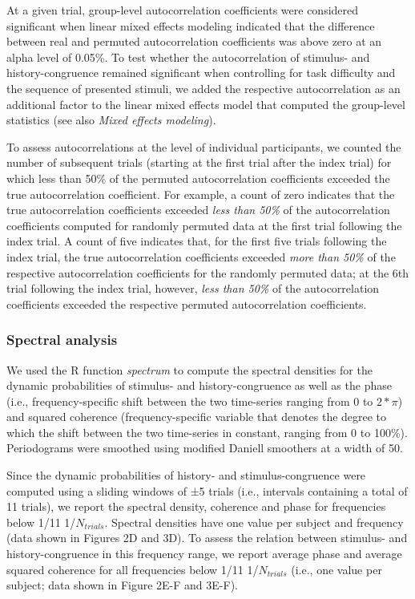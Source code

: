 \documentclass[
]{article}
\begin{document}
At a given trial, group-level autocorrelation coefficients were
considered significant when linear mixed effects modeling indicated that
the difference between real and permuted autocorrelation coefficients
was above zero at an alpha level of 0.05\%. To test whether the
autocorrelation of stimulus- and history-congruence remained significant
when controlling for task difficulty and the sequence of presented
stimuli, we added the respective autocorrelation as an additional factor
to the linear mixed effects model that computed the group-level
statistics (see also \emph{Mixed effects modeling}).

To assess autocorrelations at the level of individual participants, we
counted the number of subsequent trials (starting at the first trial
after the index trial) for which less than 50\% of the permuted
autocorrelation coefficients exceeded the true autocorrelation
coefficient. For example, a count of zero indicates that the true
autocorrelation coefficients exceeded \emph{less than 50\%} of the
autocorrelation coefficients computed for randomly permuted data at the
first trial following the index trial. A count of five indicates that,
for the first five trials following the index trial, the true
autocorrelation coefficients exceeded \emph{more than 50\%} of the
respective autocorrelation coefficients for the randomly permuted data;
at the 6th trial following the index trial, however, \emph{less than
50\%} of the autocorrelation coefficients exceeded the respective
permuted autocorrelation coefficients.

\hypertarget{spectral-analysis}{%
\subsubsection{Spectral analysis}\label{spectral-analysis}}

We used the R function \emph{spectrum} to compute the spectral densities
for the dynamic probabilities of stimulus- and history-congruence as
well as the phase (i.e., frequency-specific shift between the two
time-series ranging from 0 to \(2*\pi\)) and squared coherence
(frequency-specific variable that denotes the degree to which the shift
between the two time-series in constant, ranging from 0 to 100\%).
Periodograms were smoothed using modified Daniell smoothers at a width
of 50.

Since the dynamic probabilities of history- and stimulus-congruence were
computed using a sliding windows of ±5 trials (i.e., intervals
containing a total of 11 trials), we report the spectral density,
coherence and phase for frequencies below 1/11 1/\(N_{trials}\).
Spectral densities have one value per subject and frequency (data shown
in Figures 2D and 3D). To assess the relation between stimulus- and
history-congruence in this frequency range, we report average phase and
average squared coherence for all frequencies below 1/11
1/\(N_{trials}\) (i.e., one value per subject; data shown in Figure 2E-F
and 3E-F).
\end{document}
